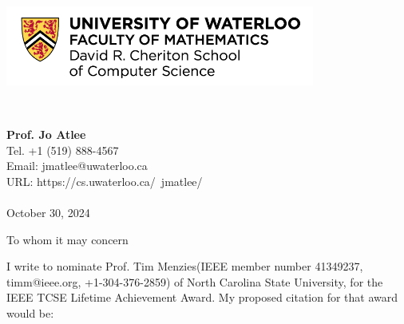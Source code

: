 \documentclass[10pt]{article}
\begin{document}
\pagestyle{plain}


\begin{minipage}{4in}
\includegraphics[width=4in]{waterloo.png}
\end{minipage}\begin{minipage}{1in}
~
\end{minipage}\begin{minipage}{3in}
{\bf Prof. Jo Atlee}\\ 
Tel.   +1 (519) 888-4567\\
Email: jmatlee@uwaterloo.ca\\
URL: https://cs.uwaterloo.ca/~jmatlee/\\~\\
 October 30, 2024
\end{minipage}
\vspace{0.5in}

To whom it may  concern

\bigskip %


I write to nominate Prof. Tim Menzies(IEEE member number 41349237,
timm@ieee.org, +1-304-376-2859) of North Carolina State University,
for the IEEE TCSE Lifetime Achievement  Award. 
%
%
%
My proposed citation for that award would be:
\end{document}
